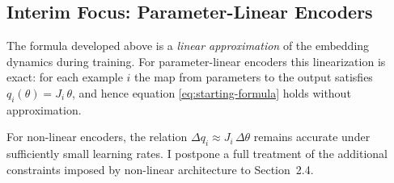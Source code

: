 \subsection{Interim Focus: Parameter-Linear Encoders}

The formula developed above is a \emph{linear approximation} of the embedding dynamics during training. For parameter-linear encoders this linearization is exact: for each example $i$ the map from parameters to the output satisfies $q_i(\theta)=J_i\,\theta$, and hence equation \eqref{eq:starting-formula} holds without approximation.

For non-linear encoders, the relation $\Delta q_i \approx J_i\,\Delta\theta$ remains accurate under sufficiently small learning rates. I postpone a full treatment of the additional constraints imposed by non-linear architecture to Section~2.4.

